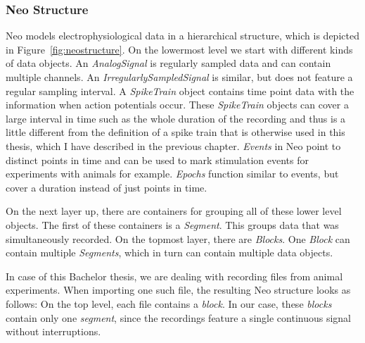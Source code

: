 \subsubsection{Neo Structure}
Neo models electrophysiological data in a hierarchical structure, which is depicted in Figure~\ref{fig:neostructure}. On the lowermost level we start with different kinds of data objects. An \textit{AnalogSignal} is regularly sampled data and can contain multiple channels. An \textit{IrregularlySampledSignal} is similar, but does not feature a regular sampling interval. A \textit{SpikeTrain} object contains time point data with the information when action potentials occur. These \textit{SpikeTrain} objects can cover a large interval in time such as the whole duration of the recording and thus is a little different from the definition of a spike train that is otherwise used in this thesis, which I have described in the previous chapter. 
\textit{Events} in Neo point to distinct points in time and can be used to mark stimulation events for experiments with animals for example. \textit{Epochs} function similar to events, but cover a duration instead of just points in time.

On the next layer up, there are containers for grouping all of these lower level objects. The first of these containers is a \textit{Segment}. This groups data that was simultaneously recorded. On the topmost layer, there are \textit{Blocks}. One \textit{Block} can contain multiple \textit{Segments}, which in turn can contain multiple data objects.

In case of this Bachelor thesis, we are dealing with recording files from animal experiments. When importing one such file, the resulting Neo structure looks as follows: On the top level, each file contains a \textit{block}. In our case, these \textit{blocks} contain only one \textit{segment}, since the recordings feature a single continuous signal without interruptions.


